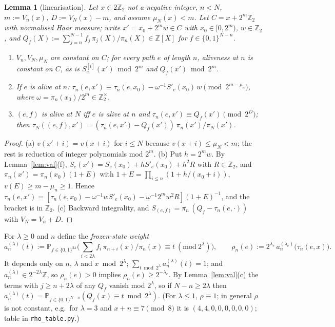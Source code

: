 \documentclass[11pt]{amsart}
\newtheorem{lemma}[theorem]{Lemma}
\theoremstyle{definition}
\newcommand{\Z}{\mathbb Z}
\renewcommand{\P}{\mathbb P}
\begin{document}
\begin{lemma}[linearisation]\label{lem:lin}
Let $x\in2\Z_2$ not a negative integer, $n<N$, $m:=V_n(x)$, $D:=V_N(x)-m$, and assume $\mu_N(x)<m$. Let $C=x+2^m\Z_2$
with normalised Haar measure; write $x'=x_0+2^mw\in C$ with $x_0\in[0,2^m)$, $w\in\Z_2$, and
$Q_f(X):=\sum_{j=n}^{N-1}f_j\,\pi_j(X)/\pi_n(X)\in\Z[X]$ for $f\in\{0,1\}^{N-n}$.
\begin{enumerate}
\item[(a)] $V_n,V_N,\mu_N$ are constant on $C$; for every path $e$ of length $n$, aliveness at $n$ is constant on $C$, as is
$S_e^{[i]}(x')\bmod 2^m$ and $Q_f(x')\bmod 2^m$.
\item[(b)] If $e$ is alive at $n$: $\tau_n(e,x')\equiv\tau_n(e,x_0)-\omega^{-1}S'_e(x_0)\,w\pmod{2^{m-\mu_n}}$, where
$\omega=\pi_n(x_0)/2^m\in\Z_2^\times$.
\item[(c)] $(e,f)$ is alive at $N$ iff $e$ is alive at $n$ and $\tau_n(e,x')\equiv Q_f(x')\pmod{2^D}$; then
$\tau_N((e,f),x')=(\tau_n(e,x')-Q_f(x'))\,\pi_n(x')/\pi_N(x')$.
\end{enumerate}
\end{lemma}
\begin{proof}
(a) $v(x'+i)=v(x+i)$ for $i\le N$ because $v(x+i)\le\mu_N<m$; the rest is reduction of integer polynomials mod $2^m$.
(b) Put $h=2^mw$. By Lemma~\ref{lem:val}(f), $S_e(x')=S_e(x_0)+hS'_e(x_0)+h^2R$ with $R\in\Z_2$, and
$\pi_n(x')=\pi_n(x_0)(1+E)$ with $1+E=\prod_{i\le n}(1+h/(x_0+i))$, $v(E)\ge m-\mu_n\ge1$. Hence
$\tau_n(e,x')=[\tau_n(e,x_0)-\omega^{-1}wS'_e(x_0)-\omega^{-1}2^mw^2R](1+E)^{-1}$, and the bracket is in $\Z_2$.
(c) Backward integrality, and $S_{(e,f)}=\pi_n\,(Q_f-\tau_n(e,\cdot))$ with $V_N=V_n+D$.
\end{proof}

For $\lambda\ge0$ and $n$ define the \emph{frozen-state weight}
\[ a_n^{(\lambda)}(t):=\P_{f\in\{0,1\}^{2\lambda}}\Big(\sum_{i<2\lambda}f_i\,\pi_{n+i}(x)/\pi_n(x)\equiv t\ (\mathrm{mod}\ 2^\lambda)\Big),\qquad
\rho_n(e):=2^{\lambda_e}\,a_n^{(\lambda_e)}\big(\tau_n(e,x)\big). \]
It depends only on $n$, $\lambda$ and $x\bmod2^\lambda$; $\sum_{t\bmod 2^\lambda}a^{(\lambda)}_n(t)=1$; and
$a^{(\lambda)}_n\in2^{-2\lambda}\Z$, so $\rho_n(e)>0$ implies $\rho_n(e)\ge2^{-\lambda_e}$. By Lemma~\ref{lem:val}(c) the terms
with $j\ge n+2\lambda$ of any $Q_f$ vanish mod $2^\lambda$, so if $N-n\ge2\lambda$ then
$a^{(\lambda)}_n(t)=\P_{f\in\{0,1\}^{N-n}}(Q_f(x)\equiv t\bmod 2^\lambda)$. (For $\lambda\le1$, $\rho\equiv1$; in general
$\rho$ is not constant, e.g.\ for $\lambda=3$ and $x+n\equiv7\pmod 8$ it is $(4,4,0,0,0,0,0,0)$; table in \texttt{rho\_table.py}.)
\end{document}
